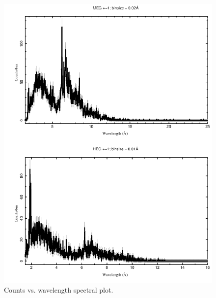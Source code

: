 \begin{figure}[ht!]
    \begin{minipage}[t]{0.45\textwidth}
        \centering
        \includegraphics[scale = 0.3]{Chapters/Figures/spc.png}
        \caption{Counts vs. wavelength spectral plot.}
        \label{spc}
    \end{minipage}
    \begin{minipage}[t]{0.6\textwidth}
        \centering

\end{minipage}
\end{figure}
